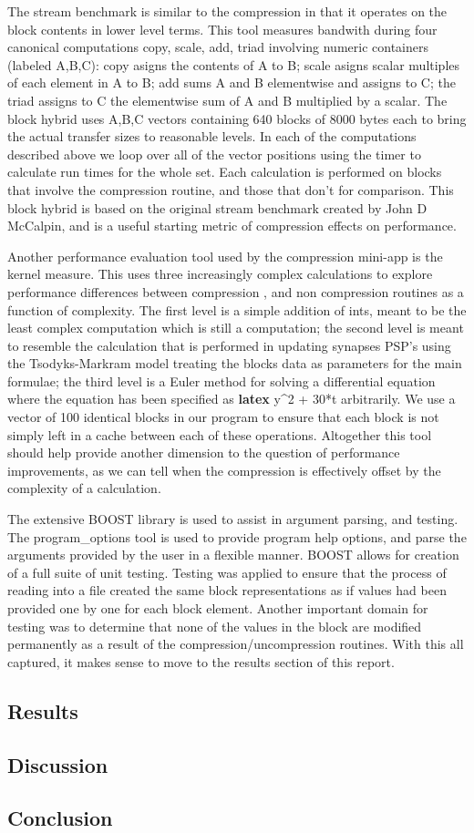 The stream benchmark is similar to the compression in that it operates
on the block contents in lower level terms. This tool measures bandwith
during four canonical computations copy, scale, add, triad involving
numeric containers (labeled A,B,C): copy asigns the contents of A to B;
scale asigns scalar multiples of each element in A to B; add sums A and
B elementwise and assigns to C; the triad assigns to C the elementwise
sum of A and B multiplied by a scalar. The block hybrid uses A,B,C
vectors containing 640 blocks of 8000 bytes each to bring the actual
transfer sizes to reasonable levels. In each of the computations
described above we loop over all of the vector positions using the timer
to calculate run times for the whole set. Each calculation is performed
on blocks that involve the compression routine, and those that don't for
comparison. This block hybrid is based on the original stream benchmark
created by John D McCalpin, and is a useful starting metric of
compression effects on performance.

Another performance evaluation tool used by the compression mini-app is
the kernel measure. This uses three increasingly complex calculations to
explore performance differences between compression , and non
compression routines as a function of complexity. The first level is a
simple addition of ints, meant to be the least complex computation which
is still a computation; the second level is meant to resemble the
calculation that is performed in updating synapses PSP's using the
Tsodyks-Markram model treating the blocks data as parameters for the
main formulae; the third level is a Euler method for solving a
differential equation where the equation has been specified as
\textbf{latex} y\^{}2 + 30*t arbitrarily. We use a vector of 100
identical blocks in our program to ensure that each block is not simply
left in a cache between each of these operations. Altogether this tool
should help provide another dimension to the question of performance
improvements, as we can tell when the compression is effectively offset
by the complexity of a calculation.

The extensive BOOST library is used to assist in argument parsing, and
testing. The program\_options tool is used to provide program help
options, and parse the arguments provided by the user in a flexible
manner. BOOST allows for creation of a full suite of unit testing.
Testing was applied to ensure that the process of reading into a file
created the same block representations as if values had been provided
one by one for each block element. Another important domain for testing
was to determine that none of the values in the block are modified
permanently as a result of the compression/uncompression routines. With
this all captured, it makes sense to move to the results section of this
report.

\subsection{Results}\label{results}

\subsection{Discussion}\label{discussion}

\subsection{Conclusion}\label{conclusion}

